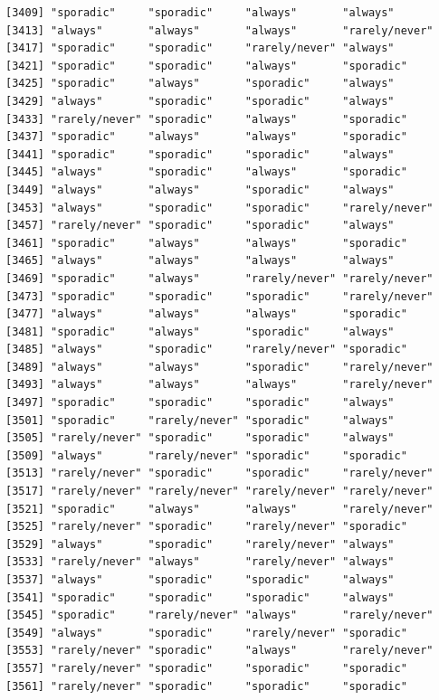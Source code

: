 \documentclass[
  letterpaper,
  DIV=11,
  numbers=noendperiod]{scrartcl}
\begin{document}
\begin{verbatim}
[3409] "sporadic"     "sporadic"     "always"       "always"      
[3413] "always"       "always"       "always"       "rarely/never"
[3417] "sporadic"     "sporadic"     "rarely/never" "always"      
[3421] "sporadic"     "sporadic"     "always"       "sporadic"    
[3425] "sporadic"     "always"       "sporadic"     "always"      
[3429] "always"       "sporadic"     "sporadic"     "always"      
[3433] "rarely/never" "sporadic"     "always"       "sporadic"    
[3437] "sporadic"     "always"       "always"       "sporadic"    
[3441] "sporadic"     "sporadic"     "sporadic"     "always"      
[3445] "always"       "sporadic"     "always"       "sporadic"    
[3449] "always"       "always"       "sporadic"     "always"      
[3453] "always"       "sporadic"     "sporadic"     "rarely/never"
[3457] "rarely/never" "sporadic"     "sporadic"     "always"      
[3461] "sporadic"     "always"       "always"       "sporadic"    
[3465] "always"       "always"       "always"       "always"      
[3469] "sporadic"     "always"       "rarely/never" "rarely/never"
[3473] "sporadic"     "sporadic"     "sporadic"     "rarely/never"
[3477] "always"       "always"       "always"       "sporadic"    
[3481] "sporadic"     "always"       "sporadic"     "always"      
[3485] "always"       "sporadic"     "rarely/never" "sporadic"    
[3489] "always"       "always"       "sporadic"     "rarely/never"
[3493] "always"       "always"       "always"       "rarely/never"
[3497] "sporadic"     "sporadic"     "sporadic"     "always"      
[3501] "sporadic"     "rarely/never" "sporadic"     "always"      
[3505] "rarely/never" "sporadic"     "sporadic"     "always"      
[3509] "always"       "rarely/never" "sporadic"     "sporadic"    
[3513] "rarely/never" "sporadic"     "sporadic"     "rarely/never"
[3517] "rarely/never" "rarely/never" "rarely/never" "rarely/never"
[3521] "sporadic"     "always"       "always"       "rarely/never"
[3525] "rarely/never" "sporadic"     "rarely/never" "sporadic"    
[3529] "always"       "sporadic"     "rarely/never" "always"      
[3533] "rarely/never" "always"       "rarely/never" "always"      
[3537] "always"       "sporadic"     "sporadic"     "always"      
[3541] "sporadic"     "sporadic"     "sporadic"     "always"      
[3545] "sporadic"     "rarely/never" "always"       "rarely/never"
[3549] "always"       "sporadic"     "rarely/never" "sporadic"    
[3553] "rarely/never" "sporadic"     "always"       "rarely/never"
[3557] "rarely/never" "sporadic"     "sporadic"     "sporadic"    
[3561] "rarely/never" "sporadic"     "sporadic"     "sporadic"    

\end{verbatim}
\end{document}
